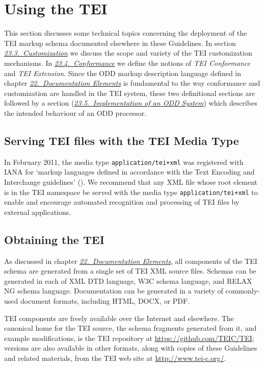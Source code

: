 
\section[{Using the TEI}]{Using the TEI}\label{USE}\par
This section discusses some technical topics concerning the deployment of the TEI markup schema documented elsewhere in these Guidelines.  In section \textit{\hyperref[MD]{23.3.\ Customization}} we discuss the scope and variety of the TEI customization mechanisms. In \textit{\hyperref[CF]{23.4.\ Conformance}} we define the notions of \textit{TEI Conformance} and \textit{TEI Extension}. Since the ODD markup description language defined in chapter \textit{\hyperref[TD]{22.\ Documentation Elements}} is fundamental to the way conformance and customization are handled in the TEI system, these two definitional sections are followed by a section (\textit{\hyperref[IM]{23.5.\ Implementation of an ODD System}}) which describes the intended behaviour of an ODD processor.
\subsection[{Serving TEI files with the TEI Media Type}]{Serving TEI files with the TEI Media Type}\label{MEDIATYPE}\par
In February 2011, the media type \texttt{application/tei+xml} was registered with IANA for ‘markup languages defined in accordance with the Text Encoding and Interchange guidelines’ (). We recommend that any XML file whose root element is in the TEI namespace be served with the media type \texttt{application/tei+xml} to enable and encourage automated recognition and processing of TEI files by external applications.
\subsection[{Obtaining the TEI}]{Obtaining the TEI}\label{DT}\par
As discussed in chapter \textit{\hyperref[TD]{22.\ Documentation Elements}}, all components of the TEI schema are generated from a single set of TEI XML source files. Schemas can be generated in each of XML DTD language, W3C schema language, and RELAX NG schema language. Documentation can be generated in a variety of commonly-used document formats, including HTML, DOCX, or PDF. \par
TEI components are freely available over the Internet and elsewhere. The canonical home for the TEI source, the schema fragments generated from it, and example modifications, is the TEI repository at \url{https://github.com/TEIC/TEI}; versions are also available in other formats, along with copies of these Guidelines and related materials, from the TEI web site at \url{http://www.tei-c.org/}.
